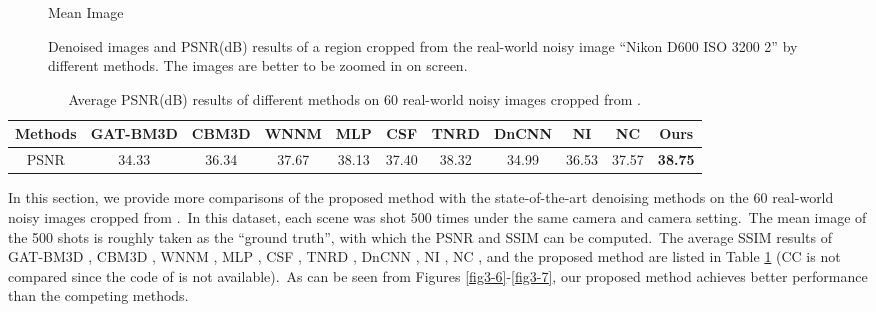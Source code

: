 \begin{figure}[t!]
{\begin{minipage}[t]{0.19\textwidth}
{\footnotesize Mean Image}
\end{minipage}
}\vspace{-3mm}
    \caption{Denoised images and PSNR(dB) results of a region cropped from the real-world noisy image ``Nikon D600 ISO 3200 2'' \cite{crosschannel2016} by different methods. The images are better to be zoomed in on screen.}
    \label{fig3-14}
\end{figure}


\begin{table}
\begin{adjustwidth}{-.2cm}{}
\scriptsize
\caption{Average PSNR(dB) results of different methods on 60 real-world noisy images cropped from \cite{crosschannel2016}.}
\label{tab3-4}
\begin{center}
\renewcommand\arraystretch{1}
\begin{tabular}{|c||c|c|c|c|c|c|c|c|c|c|}
\hline
Methods
&\textbf{GAT-BM3D}
&\textbf{CBM3D}
&\textbf{WNNM}
&\textbf{MLP}
&\textbf{CSF} 
&\textbf{TNRD} 
&\textbf{DnCNN}
&\textbf{NI} 
&\textbf{NC} 
&\textbf{Ours} 
\\
\hline
PSNR  
& 34.33 & 36.34 & 37.67 & 38.13 & 37.40 & 38.32 & 34.99 & 36.53 & 37.57 & \textbf{38.75}
\\
\hline
\end{tabular}
\end{center}
\end{adjustwidth}
\end{table}

In this section, we provide more comparisons of the proposed method with the state-of-the-art denoising methods on the 60 real-world noisy images cropped from \cite{crosschannel2016}.\ In this dataset, each scene was shot 500 times under the same camera and camera setting.\ The mean image of the 500 shots is roughly taken as the ``ground truth'', with which the PSNR and SSIM can be computed.\ The average SSIM results of GAT-BM3D \cite{makitalo2013optimal}, CBM3D \cite{bm3d}, WNNM \cite{wnnm}, MLP \cite{mlp}, CSF \cite{csf}, TNRD \cite{tnrd}, DnCNN \cite{dncnn}, NI \cite{neatimage}, NC \cite{noiseclinic,ncwebsite}, and the proposed method are listed in Table \ref{tab3-4} (CC is not compared since the code of \cite{crosschannel2016} is not available).\ As can be seen from Figures \ref{fig3-6}-\ref{fig3-7}, our proposed method achieves better performance than the competing methods.

